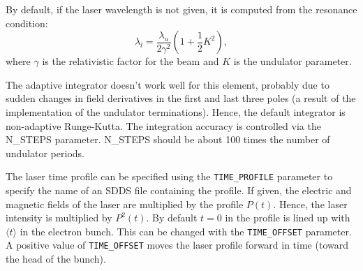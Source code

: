 By default, if the laser wavelength is not given, it is computed from the resonance
condition:
\begin{equation}
\lambda_l = \frac{\lambda_u}{2 \gamma^2} \left( 1 + \frac{1}{2} K^2 \right),
\end{equation}
where $\gamma$ is the relativistic factor for the beam and $K$ is the
undulator parameter.

The adaptive integrator doesn't work well for this element, probably
due to sudden changes in field derivatives in the first and last three
poles (a result of the implementation of the undulator terminations).
Hence, the default integrator is non-adaptive Runge-Kutta.  The
integration accuracy is controlled via the N\_STEPS parameter.
N\_STEPS should be about 100 times the number of undulator periods.

The laser time profile can be specified using the \verb|TIME_PROFILE|
parameter to specify the name of an SDDS file containing the
profile.   If given, the electric and magnetic fields of the laser are
multiplied by the profile $P(t)$.  Hence, the laser intensity is multiplied
by $P^2(t)$. By default $t=0$ in the
profile is lined up with $\langle t \rangle$ in the electron bunch.
This can be changed with the \verb|TIME_OFFSET| parameter. A positive
value of \verb|TIME_OFFSET| moves the laser profile forward in time (toward
the head of the bunch).
